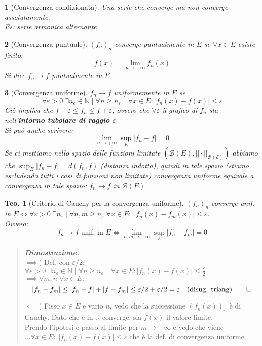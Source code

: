 \documentclass[a4paper,10pt]{article}
\newcommand{\re}{\mathbb{R}} %
\newcommand{\na}{\mathbb{N}} %
\theoremstyle{indentdefinition}
\theoremstyle{indenttheorem}
\newtheorem{thm}{Teo.}
\theoremstyle{myremark}
\theoremstyle{indentgeneral}
\newtheorem*{gen}{}
\newenvironment{dimo}{\begin{quote}\textit{\textbf{Dimostrazione.}}}{\end{quote}} %
\begin{document}
\begin{gen}[Convergenza condizionata]
    Una serie che converge ma non converge assolutamente. \\
    Es: serie armonica alternante
\end{gen}

\begin{gen}[Convergenza puntuale] 
    $(f_n)_n$ converge puntualmente  in $E$ se $\forall x\in E$ esiste finito:
    $$f(x)=\lim_{n\to+\infty}f_n(x)$$
    Si dice $f_n \to f$ puntualmente in $E$
\end{gen}

\begin{gen}[Convergenza uniforme]
$f_n \to f$ uniformemente in $E$ se 
$$\forall \varepsilon>0 \;\exists n_\varepsilon\in\na \mid \forall n\ge n_\varepsilon \quad \forall x\in E: |f_n(x)-f(x)|\le \varepsilon$$
Ciò implica che $f-\varepsilon\le f_n \le f+\varepsilon$, ovvero che $\forall\varepsilon$ il grafico di $f_n$ sta nell'\textbf{intorno tubolare di raggio $\varepsilon$}\\
Si può anche scrivere:
$$\lim_{n\to+\infty}\sup_E|f_n-f|=0$$
Se  ci mettiamo nello spazio delle funzioni limitate $(\mathcal{B}(E), ||\cdot||_{\mathcal{B(E)}})$ abbiamo che $\sup_E|f_n-f|=d(f_n, f)$ (distanza indotta), quindi in tale spazio (stiamo escludendo tutti i casi di funzioni non limitate) convergenza uniforme equivale a convergenza in tale spazio: $f_n\to f $ in $\mathcal{B}(E)$
\end{gen}

\begin{thm}[Criterio di Cauchy per la convergenza uniforme]
$(f_n)_n$ converge unif. in $E \iff \forall \varepsilon>0 \;\exists n_\varepsilon \mid \forall n,m\ge n_\varepsilon \; \forall x \in E: \; |f_n(x)-f_m(x)|\le \varepsilon$. \\
Ovvero: 
$$f_n\to f \text{ unif. in } E \iff\lim_{n,m\to+\infty}\sup_E|f_n-f_m|=0$$
\end{thm}
\begin{dimo} \\
    $\implies$) Def. con $\varepsilon /2$: $\forall \varepsilon>0 \;\exists n_\varepsilon\in\na \mid \forall n\ge n_\varepsilon \quad \forall x\in E: |f_n(x)-f(x)|\le \frac{\varepsilon}{2}$ \\
    $\implies \forall m,n \; \forall x\in E: $
    $$|f_n-f_m|\le |f_n-f|+|f-f_m|\le\varepsilon/2+\varepsilon/2=\varepsilon \quad \text{(disug. triang)} \qed$$
    
    $\impliedby$) Fisso $x\in E$ e vario $n$, vedo che la successione $(f_n(x))_n$ è di Cauchy. Dato che è in $\re$ converge, sia $f(x)$ il valore limite. \\
    Prendo l'ipotesi e passo al limite per $m\to+\infty$ e vedo che viene $\dots \forall x \in E: \; |f_n(x)-f(x)|\le \varepsilon $ che è la def. di convergenza uniforme.
  
\end{dimo}
\end{document}

